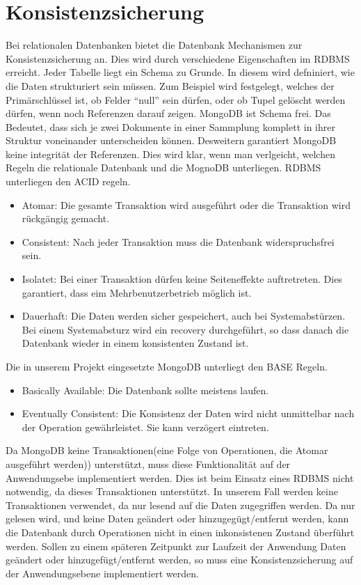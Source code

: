  \section{Konsistenzsicherung}
 Bei relationalen Datenbanken bietet die Datenbank Mechanismen zur
 Konsistenzsicherung an. Dies wird durch verschiedene Eigenschaften im RDBMS
 erreicht. Jeder Tabelle liegt ein Schema zu Grunde. In diesem wird defniniert,
 wie die Daten strukturiert sein müssen. Zum Beispiel wird festgelegt, welches
 der Primärschlüssel ist, ob Felder ``null'' sein dürfen, oder ob Tupel gelöscht
 werden dürfen, wenn noch Referenzen darauf zeigen.
 MongoDB ist Schema frei. Das Bedeutet, dass sich je zwei Dokumente in einer
Sammplung  komplett in ihrer Struktur voneinander unterscheiden können.
 Desweitern garantiert MongoDB keine integrität der Referenzen. Dies wird klar,
 wenn man verlgeicht, welchen Regeln die relationale Datenbank und die MognoDB
 unterliegen.
 RDBMS unterliegen den ACID regeln. 
 \begin{itemize}
   \item Atomar: Die gesamte Transaktion wird ausgeführt oder die Transaktion
   wird rückgängig gemacht.
   \item Consistent: Nach jeder Transaktion muss die Datenbank widerspruchsfrei
   sein.
   \item Isolatet: Bei einer Transaktion dürfen keine Seiteneffekte
   auftretreten. Dies garantiert, dass eim Mehrbenutzerbetrieb möglich ist.
   \item Dauerhaft: Die Daten werden sicher gespeichert, auch bei
   Systemabstürzen. Bei einem Systemabsturz wird ein recovery durchgeführt, so 
   dass danach die Datenbank wieder in einem konsistenten Zustand ist.
 \end{itemize}
 Die in unserem Projekt eingesetzte MongoDB unterliegt den BASE Regeln.
 \begin{itemize}
   \item Basically Available: Die Datenbank sollte meistens laufen.
   \item Eventually Consistent: Die Konsistenz der Daten wird nicht unmittelbar
   nach der Operation gewährleistet. Sie kann verzögert eintreten.
\end{itemize}
Da MongoDB keine Transaktionen(eine Folge von Operationen, die Atomar
ausgeführt werden)) unterstützt, muss diese Funktionalität auf der
Anwendungsebe implementiert werden. Dies ist beim Einsatz eines RDBMS nicht notwendig,
da dieses Transaktionen unterstützt. In unserem Fall werden keine
Transaktionen verwendet, da nur lesend auf die Daten zugegriffen werden.
Da nur gelesen wird, und keine Daten geändert oder hinzugegügt/entfernt werden,
kann die Datenbank durch Operationen nicht in einen inkonsistenen Zustand
überführt werden. Sollen zu einem späteren Zeitpunkt zur Laufzeit der
Anwendung Daten geändert oder hinzugefügt/entfernt werden, 
so muss eine Konsistenzsicherung auf der Anwendungsebene  implementiert werden.
 

		